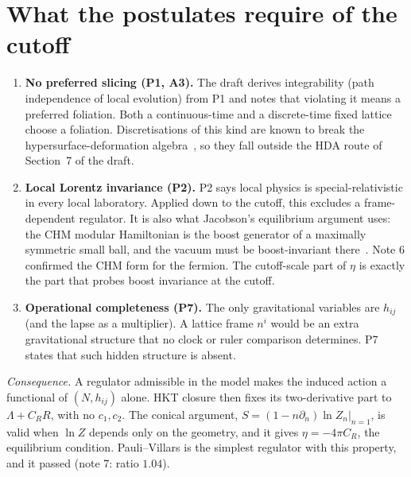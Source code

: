 \documentclass[11pt]{article}
\begin{document}
\section{What the postulates require of the cutoff}
\begin{enumerate}
\item \textbf{No preferred slicing (P1, A3).} The draft derives integrability (path independence of local evolution) from P1 and notes that violating it means a preferred foliation. Both a continuous-time and a discrete-time fixed lattice choose a foliation. Discretisations of this kind are known to break the hypersurface-deformation algebra~\cite{GambiniPullin,Dittrich}, so they fall outside the HDA route of Section~7 of the draft.
\item \textbf{Local Lorentz invariance (P2).} P2 says local physics is special-relativistic in every local laboratory. Applied down to the cutoff, this excludes a frame-dependent regulator. It is also what Jacobson's equilibrium argument uses: the CHM modular Hamiltonian is the boost generator of a maximally symmetric small ball, and the vacuum must be boost-invariant there~\cite{Jacobson2016}. Note 6 confirmed the CHM form for the fermion. The cutoff-scale part of $\eta$ is exactly the part that probes boost invariance at the cutoff.
\item \textbf{Operational completeness (P7).} The only gravitational variables are $h_{ij}$ (and the lapse as a multiplier). A lattice frame $n^i$ would be an extra gravitational structure that no clock or ruler comparison determines. P7 states that such hidden structure is absent.
\end{enumerate}
\emph{Consequence.} A regulator admissible in the model makes the induced action a functional of $(N,h_{ij})$ alone. HKT closure then fixes its two-derivative part to $\Lambda+C_R R$, with no $c_1,c_2$. The conical argument, $S=(1-n\partial_n)\ln Z_n|_{n=1}$, is valid when $\ln Z$ depends only on the geometry, and it gives $\eta=-4\pi C_R$, the equilibrium condition. Pauli--Villars is the simplest regulator with this property, and it passed (note 7: ratio $1.04$).
\end{document}
